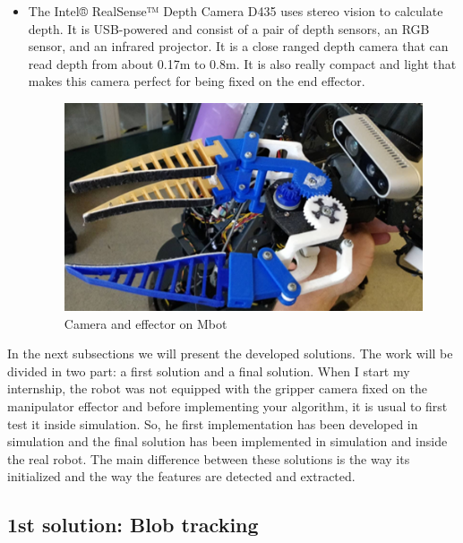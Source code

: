 \begin{itemize}
\newpage
    \item 
The Intel® RealSense™ Depth Camera D435 uses stereo vision to calculate depth. It is USB-powered and consist of a pair of depth sensors, an RGB sensor, and an infrared projector. It is a close ranged depth camera that can read depth from about 0.17m to 0.8m. It is also really compact and light that makes this camera perfect for being fixed on the end effector.
\begin{figure} [!ht]
    \centering
    \includegraphics[width=0.5\linewidth]{images/camera_and_gripper_real.png}
    \caption{Camera and effector on Mbot}
    \label{pict:camera_gripper}
\end{figure}
\end{itemize}

In the next subsections we will present the developed solutions. The work will be divided in two part: a first solution and a final solution. When I start my internship, the robot was not equipped with the gripper camera fixed on the manipulator effector and before implementing your algorithm, it is usual to first test it inside simulation. So, he first implementation has been developed in simulation and the final solution has been implemented in simulation and inside the real robot. The main difference between these solutions is the way its initialized and the way the features are detected and extracted.

\subsection{1st solution: Blob tracking}
  
